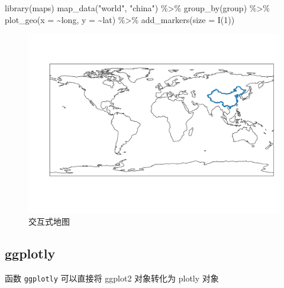 \documentclass[
  b5paper,
  UTF8,twoside]{book}
\newenvironment{Shaded}{\begin{snugshade}}{\end{snugshade}}
\newcommand{\AttributeTok}[1]{\textcolor[rgb]{0.77,0.63,0.00}{#1}}
\newcommand{\DecValTok}[1]{\textcolor[rgb]{0.00,0.00,0.81}{#1}}
\newcommand{\FunctionTok}[1]{\textcolor[rgb]{0.00,0.00,0.00}{#1}}
\newcommand{\NormalTok}[1]{#1}
\newcommand{\SpecialCharTok}[1]{\textcolor[rgb]{0.00,0.00,0.00}{#1}}
\newcommand{\StringTok}[1]{\textcolor[rgb]{0.31,0.60,0.02}{#1}}
\begin{document}
\begin{Shaded}
\begin{Highlighting}[]
\FunctionTok{library}\NormalTok{(maps)}
\FunctionTok{map\_data}\NormalTok{(}\StringTok{"world"}\NormalTok{, }\StringTok{"china"}\NormalTok{) }\SpecialCharTok{\%\textgreater{}\%}
  \FunctionTok{group\_by}\NormalTok{(group) }\SpecialCharTok{\%\textgreater{}\%}
  \FunctionTok{plot\_geo}\NormalTok{(}\AttributeTok{x =} \SpecialCharTok{\textasciitilde{}}\NormalTok{long, }\AttributeTok{y =} \SpecialCharTok{\textasciitilde{}}\NormalTok{lat) }\SpecialCharTok{\%\textgreater{}\%}
  \FunctionTok{add\_markers}\NormalTok{(}\AttributeTok{size =} \FunctionTok{I}\NormalTok{(}\DecValTok{1}\NormalTok{))}
\end{Highlighting}
\end{Shaded}

\begin{figure}

{\centering \includegraphics{interactives/plotly-china-map} 

}

\caption{交互式地图}\label{fig:plotly-china-map}
\end{figure}

\hypertarget{subsec:plotly-ggplotly}{%
\subsection{ggplotly}\label{subsec:plotly-ggplotly}}

函数 \texttt{ggplotly} 可以直接将 ggplot2 对象转化为 plotly 对象
\end{document}
